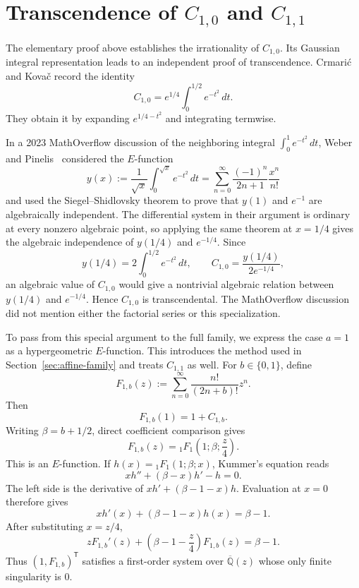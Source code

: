 \documentclass[12pt]{article}
\begin{document}
\section{Transcendence of \texorpdfstring{$C_{1,0}$ and $C_{1,1}$}{C(1,0) and C(1,1)}}
\label{sec:a1-transcendence}

The elementary proof above establishes the irrationality of $C_{1,0}$. Its Gaussian integral representation leads to an independent proof of transcendence. Crmari\'c and Kova\v{c} record the identity~\cite[p.~55 and footnote~1]{crmaric-kovac}
\[
C_{1,0}=e^{1/4}\int_0^{1/2}e^{-t^2}\,dt.
\]
They obtain it by expanding $e^{1/4-t^2}$ and integrating termwise.

In a 2023 MathOverflow discussion of the neighboring integral $\int_0^1e^{-t^2}\,dt$, Weber and Pinelis~\cite{mathoverflow} considered the $E$-function
\[
y(x):=\frac1{\sqrt{x}}\int_0^{\sqrt{x}}e^{-t^2}\,dt
=\sum_{n=0}^{\infty}\frac{(-1)^n}{2n+1}\frac{x^n}{n!}
\]
and used the Siegel--Shidlovsky theorem to prove that $y(1)$ and $e^{-1}$ are algebraically independent. The differential system in their argument is ordinary at every nonzero algebraic point, so applying the same theorem at $x=1/4$ gives the algebraic independence of $y(1/4)$ and $e^{-1/4}$. Since
\[
y(1/4)=2\int_0^{1/2}e^{-t^2}\,dt,
\qquad
C_{1,0}=\frac{y(1/4)}{2e^{-1/4}},
\]
an algebraic value of $C_{1,0}$ would give a nontrivial algebraic relation between $y(1/4)$ and $e^{-1/4}$. Hence $C_{1,0}$ is transcendental. The MathOverflow discussion did not mention either the factorial series or this specialization.

To pass from this special argument to the full family, we express the case $a=1$ as a hypergeometric $E$-function. This introduces the method used in Section~\ref{sec:affine-family} and treats $C_{1,1}$ as well. For $b\in\{0,1\}$, define
\[
F_{1,b}(z):=\sum_{n=0}^{\infty}\frac{n!}{(2n+b)!}z^n.
\]
Then
\[
F_{1,b}(1)=1+C_{1,b}.
\]
Writing $\beta=b+1/2$, direct coefficient comparison gives
\[
F_{1,b}(z)={}_1F_1\!\left(1;\beta;\frac z4\right).
\]
This is an $E$-function. If $h(x)={}_1F_1(1;\beta;x)$, Kummer's equation reads
\[
xh''+(\beta-x)h'-h=0.
\]
The left side is the derivative of $xh'+(\beta-1-x)h$. Evaluation at $x=0$ therefore gives
\[
xh'(x)+(\beta-1-x)h(x)=\beta-1.
\]
After substituting $x=z/4$,
\[
zF_{1,b}'(z)+\left(\beta-1-\frac z4\right)F_{1,b}(z)=\beta-1.
\tag{1}
\]
Thus $(1,F_{1,b})^{\mathsf T}$ satisfies a first-order system over $\overline{\mathbb Q}(z)$ whose only finite singularity is $0$.
\end{document}
